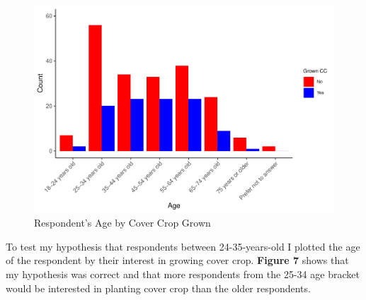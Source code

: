 \documentclass[12pt,]{article}
\begin{document}
\begin{table}[h]
\end{table}\begin{figure}
\includegraphics[width=0.9\linewidth]{Project_Template_files/figure-latex/age plot 1-1} \caption{Respondent's Age by Cover Crop Grown}\label{fig:age plot 1}
\end{figure}

\FloatBarrier

\newpage

To test my hypothesis that respondents between 24-35-years-old I plotted
the age of the respondent by their interest in growing cover crop.
\textbf{Figure 7} shows that my hypothesis was correct and that more
respondents from the 25-34 age bracket would be interested in planting
cover crop than the older respondents.

  \providecommand{\huxb}[2]{\arrayrulecolor[RGB]{#1}\global\arrayrulewidth=#2pt}
  \providecommand{\huxvb}[2]{\color[RGB]{#1}\vrule width #2pt}
  \providecommand{\huxtpad}[1]{\rule{0pt}{\baselineskip+#1}}
  \providecommand{\huxbpad}[1]{\rule[-#1]{0pt}{#1}}
\end{document}

